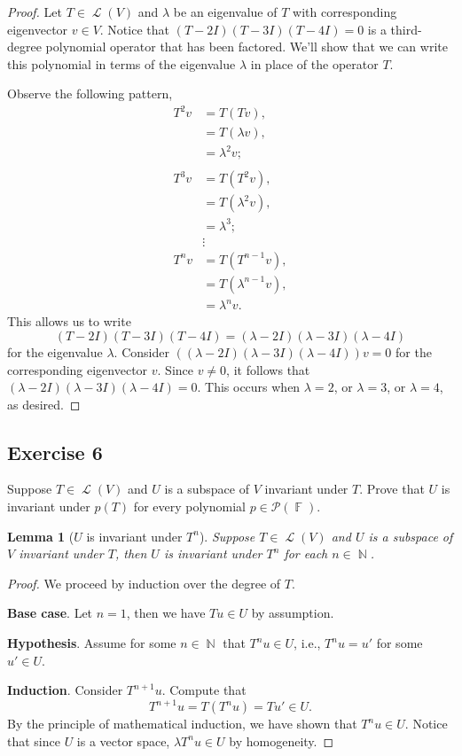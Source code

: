 \documentclass[letterpaper, 12pt]{amsart}
\DeclareMathOperator{\N}{\mathbb{N}}				%
\DeclareMathOperator{\F}{\mathbb{F}}				%
\DeclareMathOperator{\Ell}{\mathscr{L}}				%
\newtheorem{lemma}[thm]{Lemma}
\theoremstyle{definition}  							%
\begin{document}
		\begin{proof}
		Let $T \in \Ell(V)$ and $\lambda$ be an eigenvalue of $T$ with corresponding eigenvector $v \in V$.
		Notice that $(T - 2I)(T - 3I)(T - 4I) = 0$ is a third-degree polynomial operator that has been factored.
		We'll show that we can write this polynomial in terms of the eigenvalue $\lambda$ in place of the operator $T$.
		
		Observe the following pattern,
			\begin{align*}
				T^{2}v &= T(Tv), \\
				&= T(\lambda v), \\
				&= \lambda^2 v; \\
				\\
				T^3v &= T(T^2v), \\
				&= T(\lambda^2v), \\
				&= \lambda^{3}; \\
				&\vdots \\
				T^nv &= T(T^{n-1}v), \\
				&= T(\lambda^{n-1}v), \\
				&= \lambda^{n}v.
			\end{align*}
		This allows us to write $$(T - 2I)(T - 3I)(T - 4I) = (\lambda - 2I)(\lambda - 3I)(\lambda - 4I)$$ for the eigenvalue $\lambda$.
		Consider $((\lambda - 2I)(\lambda - 3I)(\lambda - 4I))v = 0$ for the corresponding eigenvector $v$.
		Since $v \neq 0$, it follows that $(\lambda - 2I)(\lambda - 3I)(\lambda - 4I) = 0$.
		This occurs when $\lambda = 2$, or $\lambda = 3$, or $\lambda = 4$, as desired.
		\end{proof}

		\subsection*{Exercise 6}
		Suppose $T \in \Ell(V)$ and $U$ is a subspace of $V$ invariant under $T$. 
		Prove that $U$ is invariant under $p(T)$ for every polynomial $p \in \mathcal{P}(\F)$.

		\vspace{2mm}

		\setcounter{section}{5}
		\begin{lemma}[$U$ is invariant under $T^{n}$]\label{lemma}
		Suppose $T \in \Ell(V)$ and $U$ is a subspace of $V$ invariant under $T$, then $U$ is invariant under $T^{n}$ for each $n \in \N$.
		\end{lemma}
		\begin{proof}
		We proceed by induction over the degree of $T$.

		\textbf{Base case}. Let $n = 1$, then we have $Tu \in U$ by assumption.

		\textbf{Hypothesis}. Assume for some $n \in \N$ that $T^{n}u \in U$, i.e., $T^{n}u = u'$ for some $u' \in U$.

		\textbf{Induction}. Consider $T^{n+1}u$.
		Compute that $$T^{n+1}u = T(T^{n}u) = Tu' \in U.$$
		By the principle of mathematical induction, we have shown that $T^{n}u \in U$.
		Notice that since $U$ is a vector space, $\lambda T^{n}u \in U$ by homogeneity.
		\end{proof}
\end{document}
